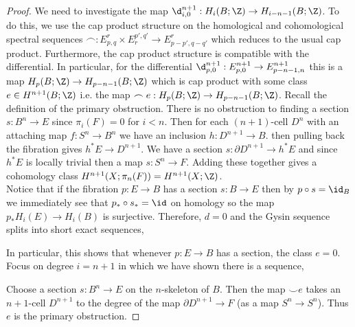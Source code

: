 \documentclass[12pt]{extarticle}
\begin{document}
\begin{proof}
We need to investigate the map $\d^{n+1}_{i,0} : H_i(B ; \Z) \to H_{i - n - 1}(B; \Z)$. To do this, we use the cap product structure on the homological and cohomological spectral sequences $\frown : E^r_{p,q} \times E^{p', q'}_r \to E^r_{p-p', q-q'}$ which reduces to the usual cap product. Furthermore, the cap product structure is compatible with the differential. In particular, for the differential $\d^{n+1}_{p, 0} : E^{n+1}_{p, 0} \to E^{n+1}_{p - n - 1, n}$ this is a map $H_p(B; \Z) \to H_{p - n - 1}(B ; \Z)$ which is cap product with some class $e \in H^{n+1}(B ; \Z)$ i.e. the map $\frown e : H_p(B ; \Z) \to H_{p - n - 1}(B ; \Z)$. Recall the definition of the primary obstruction. There is no obstruction to finding a section $s : B^{n} \to E$ since $\pi_{i}(F) = 0$ for $i < n$. Then for each $(n+1)$-cell $D^n$ with an attaching map $f : S^{n} \to B^n$ we have an inclusion $h : D^{n+1} \to B$. then pulling back the fibration gives $h^* E \to D^{n+1}$. We have a section $s : \partial D^{n+1} \to h^* E$ and since $h^* E$ is locally trivial then a map $s : S^n \to F$. Adding these together gives a cohomology class $H^{n+1}(X ; \pi_n(F)) = H^{n+1}(X; \Z)$. 
\bigskip\\
Notice that if the fibration $p : E \to B$ has a section $s : B \to E$ then by $p \circ s = \id_B$ we immediately see that $p_* \circ s_* = \id$ on homology so the map $p_* H_i(E) \to H_i(B)$ is surjective. Therefore, $d = 0$ and the Gysin sequence splits into short exact sequences,
\begin{center}
\end{center}
In particular, this shows that whenever $p : E \to B$ has a section, the class $e = 0$. Focus on degree $i = n + 1$ in which we have shown there is a sequence,
\begin{center}
\end{center}
Choose a section $s : B^n \to E$ on the $n$-skeleton of $B$. Then the map $\smile e$ takes an $n+1$-cell $D^{n+1}$ to the degree of the map $\partial D^{n+1} \to F$ (as a map $S^n \to S^n$). Thus $e$ is the primary obstruction. 
\end{proof}
\end{document}
